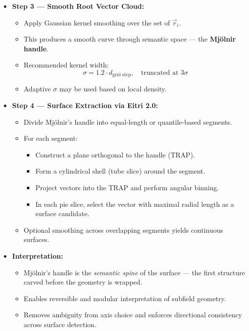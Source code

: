 \begin{itemize}
            \item \textbf{Step 3 — Smooth Root Vector Cloud:}
                  \begin{itemize}
                      \item Apply Gaussian kernel smoothing over the set of $\vec{r}_i$.
                      \item This produces a smooth curve through semantic space — the \textbf{Mjölnir handle}.
                      \item Recommended kernel width:
                            \[
                                \sigma = 1.2 \cdot d_{\text{grid step}}, \quad \text{truncated at } 3\sigma
                            \]
                      \item Adaptive $\sigma$ may be used based on local density.
                  \end{itemize}

            \item \textbf{Step 4 — Surface Extraction via Eitri 2.0:}
                  \begin{itemize}
                  \item Divide Mjölnir's handle into equal-length or quantile-based segments.
                  \item For each segment:
                        \begin{itemize}
                            \item Construct a plane orthogonal to the handle (TRAP).
                            \item Form a cylindrical shell (tube slice) around the segment.
                            \item Project vectors into the TRAP and perform angular binning.
                            \item In each pie slice, select the vector with maximal radial length as a surface candidate.
                        \end{itemize}
                  \item Optional smoothing across overlapping segments yields continuous surfaces.
                  \end{itemize}

            \item \textbf{Interpretation:}
                  \begin{itemize}
                      \item Mjölnir’s handle is the \textit{semantic spine} of the surface — the first structure carved before the geometry is wrapped.
                      \item Enables reversible and modular interpretation of subfield geometry.
                      \item Removes ambiguity from axis choice and enforces directional consistency across surface detection.
                  \end{itemize}
        \end{itemize}

